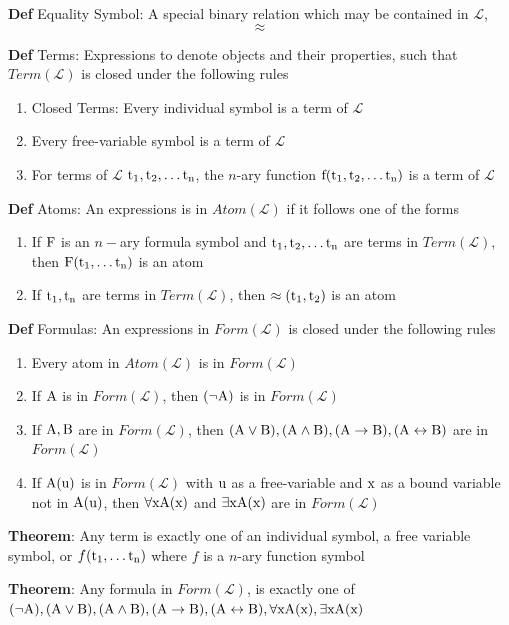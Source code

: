 \documentclass[11pt,notitlepage]{report}
\newcommand{\mc}[1]{\ensuremath{\mathcal{#1}}}
\newcommand{\tbf}[1]{\textbf{#1}}
\begin{document}
\tbf{Def} Equality Symbol: A special binary relation which may be contained in $\mc L$,
$$\approx$$

\tbf{Def} Terms: Expressions to denote objects and their properties, such that $Term(\mc L)$ is closed under the following rules
\begin{enumerate}
    \item Closed Terms: Every individual symbol is a term of $\mc L$
    \item Every free-variable symbol is a term of $\mc L$
    \item For terms of $\mc L$ $\rm t_1, t_2, \dots t_n$, the $n$-ary function $\rm f(t_1, t_2, \dots t_n)$ is a term of $\mc L$
\end{enumerate}

\tbf{Def} Atoms: An expressions is in $Atom(\mc L)$ if it follows one of the forms
\begin{enumerate}
    \item If $\rm F$ is an $n-$ary formula symbol and $\rm t_1, t_2, \dots t_n$ are terms in $Term(\mc L)$, then $\rm F(\rm t_1, \dots t_n)$ is an atom
    \item If $\rm t_1, t_n$ are terms in $Term(\mc L)$, then $\approx(\rm t_1, t_2)$ is an atom
\end{enumerate}

\tbf{Def} Formulas: An expressions in $Form(\mc L)$ is closed under the following rules
\begin{enumerate}
    \item Every atom in $Atom(\mc L)$ is in $Form(\mc L)$
    \item If $\rm A$ is in $Form(\mc L)$, then $(\neg \rm A)$ is in $Form(\mc L)$
    \item If $\rm A, B$ are in $Form(\mc L)$, then $(\rm A \vee B), (\rm A \wedge B), (\rm A \to B), (\rm A \leftrightarrow B)$ are in $Form(\mc L)$
    \item If $\rm A(u)$ is in $Form(\mc L)$ with $\rm u$ as a free-variable and $\rm x$ as a bound variable not in $\rm A(u)$, then $\forall \rm x A(x)$ and $\exists \rm x A(x)$ are in $Form(\mc L)$
\end{enumerate}

\tbf{Theorem}: Any term is exactly one of an individual symbol, a free variable symbol, or $f(\rm t_1, \dots t_n)$ where $f$ is a $n$-ary function symbol

\tbf{Theorem}: Any formula in $Form(\mc L)$, is exactly one of $\rm (\neg A), (A \vee B), (A \wedge B), (A \to B), (A \leftrightarrow B), \forall x A(x), \exists x A(x)$ 
\end{document}
